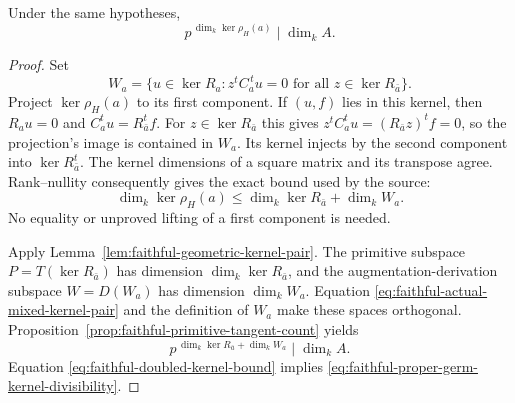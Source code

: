 \begin{srproposition}
\label{prop:faithful-proper-germ-kernel-divisibility}
Under the same hypotheses,
\[
       p^{\,\dim_k\ker\rho_H(a)}\mid\dim_k A .
 \tag{KG9}\label{eq:faithful-proper-germ-kernel-divisibility}
\]
\end{srproposition}
\begin{proof}
Set
\[
 W_a=\{u\in\ker R_a:
                  z^tC_a^{\,t}u=0\text{ for all }z\in\ker R_{\bar a}\}.
\]
Project \(\ker\rho_H(a)\) to its first component.
If \((u,f)\) lies in this kernel, then \(R_a u=0\) and
\(C_a^tu=R_{\bar a}^tf\).
For \(z\in\ker R_{\bar a}\) this gives
\(z^tC_a^tu=(R_{\bar a}z)^tf=0\), so the projection's image
is contained in \(W_a\).
Its kernel injects by the second component into
\(\ker R_{\bar a}^t\).
The kernel dimensions of a square matrix and its transpose agree.
Rank--nullity consequently gives the exact bound used by the source:
\[
       \dim_k\ker\rho_H(a)
             \le \dim_k\ker R_{\bar a}+\dim_k W_a.
 \tag{KG10}\label{eq:faithful-doubled-kernel-bound}
\]
No equality or unproved lifting of a first component is needed.

Apply Lemma~\ref{lem:faithful-geometric-kernel-pair}.
The primitive subspace \(P=T(\ker R_{\bar a})\) has dimension
\(\dim_k\ker R_{\bar a}\), and the augmentation-derivation
subspace \(W=D(W_a)\) has dimension \(\dim_kW_a\).
Equation \eqref{eq:faithful-actual-mixed-kernel-pair} and the
definition of \(W_a\) make these spaces orthogonal.
Proposition~\ref{prop:faithful-primitive-tangent-count} yields
\[
 p^{\,\dim_k\ker R_{\bar a}+\dim_kW_a}\mid\dim_kA.
\]
Equation \eqref{eq:faithful-doubled-kernel-bound} implies
\eqref{eq:faithful-proper-germ-kernel-divisibility}.
\end{proof}

